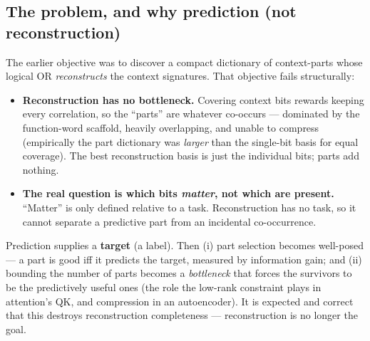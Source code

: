 \documentclass[11pt]{article}
\begin{document}
\subsection{The problem, and why prediction (not reconstruction)}
The earlier objective was to discover a compact dictionary of context-parts whose logical OR \emph{reconstructs} the context signatures. That objective fails structurally:
\begin{itemize}[nosep]
\item \textbf{Reconstruction has no bottleneck.} Covering context bits rewards keeping every correlation, so the ``parts'' are whatever co-occurs --- dominated by the function-word scaffold, heavily overlapping, and unable to compress (empirically the part dictionary was \emph{larger} than the single-bit basis for equal coverage). The best reconstruction basis is just the individual bits; parts add nothing.
\item \textbf{The real question is which bits \emph{matter}, not which are present.} ``Matter'' is only defined relative to a task. Reconstruction has no task, so it cannot separate a predictive part from an incidental co-occurrence.
\end{itemize}
Prediction supplies a \textbf{target} (a label). Then (i) part selection becomes well-posed --- a part is good iff it predicts the target, measured by information gain; and (ii) bounding the number of parts becomes a \emph{bottleneck} that forces the survivors to be the predictively useful ones (the role the low-rank constraint plays in attention's QK, and compression in an autoencoder). It is expected and correct that this destroys reconstruction completeness --- reconstruction is no longer the goal.
\end{document}
